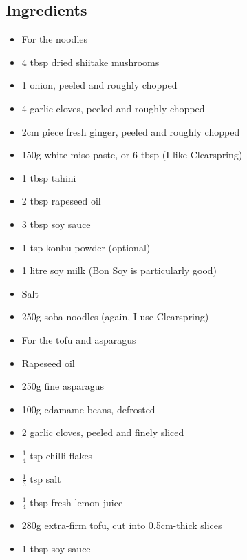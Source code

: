 \documentclass{book}
\begin{document}
\subsection*{Ingredients}
\begin{itemize}
\item For the noodles
\item 4 tbsp dried shiitake mushrooms 
\item 1 onion, peeled and roughly chopped
\item 4 garlic cloves, peeled and roughly chopped 
\item 2cm piece fresh ginger, peeled and roughly chopped 
\item 150g white miso paste, or 6 tbsp (I like Clearspring) 
\item 1 tbsp tahini 
\item 2 tbsp rapeseed oil 
\item 3 tbsp soy sauce 
\item 1 tsp konbu powder (optional) 
\item 1 litre soy milk (Bon Soy is particularly good) 
\item Salt
\item 250g soba noodles (again, I use Clearspring)
\end{itemize}

\begin{itemize}
\item For the tofu and asparagus
\item Rapeseed oil 
\item 250g fine asparagus 
\item 100g edamame beans, defrosted 
\item 2 garlic cloves, peeled and finely sliced
\item $\frac{1}{4}$ tsp chilli flakes
\item $\frac{1}{3}$ tsp salt 
\item $\frac{1}{4}$ tbsp fresh lemon juice 
\item 280g extra-firm tofu, cut into 0.5cm-thick slices
\item 1 tbsp soy sauce
\end{itemize}
\end{document}
